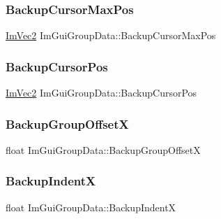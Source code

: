 \hypertarget{struct_im_gui_group_data_abb83c4db050ef7d20485902cc14c4a0d}{}\label{struct_im_gui_group_data_abb83c4db050ef7d20485902cc14c4a0d} 
\subsubsection{\texorpdfstring{Backup\+Cursor\+Max\+Pos}{BackupCursorMaxPos}}
{\footnotesize\ttfamily \hyperlink{struct_im_vec2}{Im\+Vec2} Im\+Gui\+Group\+Data\+::\+Backup\+Cursor\+Max\+Pos}

\hypertarget{struct_im_gui_group_data_a8b29e2d9081876fd4847b1cd86c60500}{}\label{struct_im_gui_group_data_a8b29e2d9081876fd4847b1cd86c60500} 
\subsubsection{\texorpdfstring{Backup\+Cursor\+Pos}{BackupCursorPos}}
{\footnotesize\ttfamily \hyperlink{struct_im_vec2}{Im\+Vec2} Im\+Gui\+Group\+Data\+::\+Backup\+Cursor\+Pos}

\hypertarget{struct_im_gui_group_data_a0cee1b14b574a4bf883ceb1be58a9332}{}\label{struct_im_gui_group_data_a0cee1b14b574a4bf883ceb1be58a9332} 
\subsubsection{\texorpdfstring{Backup\+Group\+OffsetX}{BackupGroupOffsetX}}
{\footnotesize\ttfamily float Im\+Gui\+Group\+Data\+::\+Backup\+Group\+OffsetX}

\hypertarget{struct_im_gui_group_data_a9d39092c1c154ba4809ae79e47baeb64}{}\label{struct_im_gui_group_data_a9d39092c1c154ba4809ae79e47baeb64} 
\subsubsection{\texorpdfstring{Backup\+IndentX}{BackupIndentX}}
{\footnotesize\ttfamily float Im\+Gui\+Group\+Data\+::\+Backup\+IndentX}

